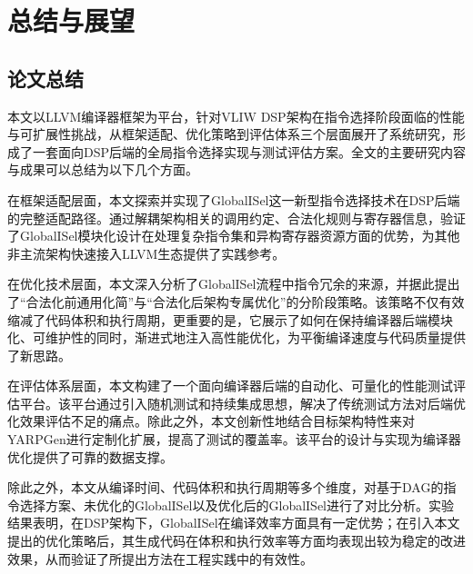 \chapter{总结与展望}


\section{论文总结}
本文以LLVM编译器框架为平台，针对VLIW DSP架构在指令选择阶段面临的性能与可扩展性挑战，从框架适配、优化策略到评估体系三个层面展开了系统研究，形成了一套面向DSP后端的全局指令选择实现与测试评估方案。全文的主要研究内容与成果可以总结为以下几个方面。

\par

在框架适配层面，本文探索并实现了GlobalISel这一新型指令选择技术在DSP后端的完整适配路径。通过解耦架构相关的调用约定、合法化规则与寄存器信息，验证了GlobalISel模块化设计在处理复杂指令集和异构寄存器资源方面的优势，为其他非主流架构快速接入LLVM生态提供了实践参考。

\par

在优化技术层面，本文深入分析了GlobalISel流程中指令冗余的来源，并据此提出了“合法化前通用化简”与“合法化后架构专属优化”的分阶段策略。该策略不仅有效缩减了代码体积和执行周期，更重要的是，它展示了如何在保持编译器后端模块化、可维护性的同时，渐进式地注入高性能优化，为平衡编译速度与代码质量提供了新思路。

\par

在评估体系层面，本文构建了一个面向编译器后端的自动化、可量化的性能测试评估平台。该平台通过引入随机测试和持续集成思想，解决了传统测试方法对后端优化效果评估不足的痛点。除此之外，本文创新性地结合目标架构特性来对YARPGen进行定制化扩展，提高了测试的覆盖率。该平台的设计与实现为编译器优化提供了可靠的数据支撑。

\par

除此之外，本文从编译时间、代码体积和执行周期等多个维度，对基于DAG的指令选择方案、未优化的GlobalISel以及优化后的GlobalISel进行了对比分析。实验结果表明，在DSP架构下，GlobalISel在编译效率方面具有一定优势；在引入本文提出的优化策略后，其生成代码在体积和执行效率等方面均表现出较为稳定的改进效果，从而验证了所提出方法在工程实践中的有效性。


